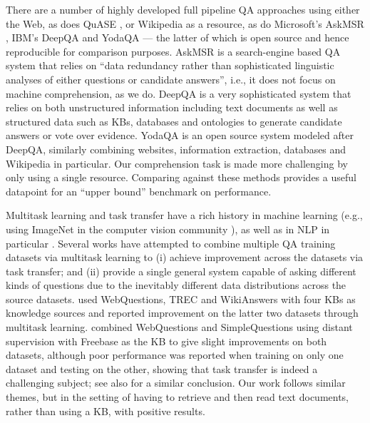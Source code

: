 \documentclass[11pt,a4paper]{article}
\begin{document}
There are a number of highly developed full pipeline QA approaches using either the Web, as does QuASE \cite{sun2015open}, or Wikipedia as a resource, as do Microsoft's AskMSR \cite{brill2002askmsr},
IBM's DeepQA \cite{ferrucci2010building} and YodaQA \cite{baudivs2015yodaqa,baudivs2015modeling} --- the latter of which is open source and hence reproducible for comparison purposes.
AskMSR is a search-engine based QA system that relies on ``data redundancy rather than sophisticated linguistic analyses of either questions or candidate answers'', i.e., it does not focus on machine comprehension, as we do. DeepQA is a very sophisticated system that relies on both unstructured information including text documents as well as structured data such as KBs, databases and ontologies to generate candidate answers or vote over evidence. YodaQA is an open source system modeled after DeepQA, similarly combining websites, information extraction, databases and Wikipedia in particular. Our comprehension task is made more challenging by only using a single resource. Comparing against these methods provides a useful datapoint for an ``upper bound'' benchmark on performance.










Multitask learning \cite{caruana1998multitask} and task transfer have a rich history in machine learning (e.g., using ImageNet in the computer vision community \cite{huh2016makes}),
as well as in NLP in particular \cite{Collobert08}.
Several works have attempted to combine multiple QA training datasets via multitask learning to (i) achieve improvement across the datasets via task transfer; and (ii) provide a single general system capable of asking different kinds of questions due to the inevitably different data distributions across the source datasets. \citet{fader2014open} used WebQuestions, TREC and WikiAnswers with four KBs as knowledge sources and reported improvement on the latter two datasets through multitask learning.
\citet{bordes2015large} combined WebQuestions and SimpleQuestions using distant supervision with Freebase as the KB to give slight improvements on both datasets, although poor performance was reported when training on only one dataset and testing on the other, showing that task transfer is indeed a challenging subject; see also \cite{kadlecparticular} for a similar conclusion.
Our work follows similar themes, but in the setting of having to retrieve and then read text documents, rather than using a KB, with positive results.
\end{document}
